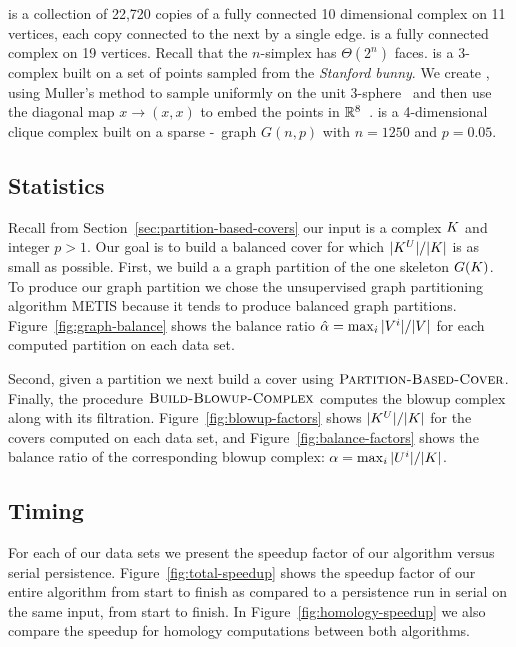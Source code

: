 {\blobs} is a collection of
22,720 copies of a fully connected 10 dimensional complex on 11 vertices, each 
copy connected to the next by a single edge. {\clique} is a fully 
connected complex on 19 vertices. Recall that the $n$-simplex has $\Theta(2^n)$ 
faces. {\bunny} is a 3-complex built on a set of points sampled from the 
\emph{Stanford bunny}. We create {\sphere}, using Muller's method to sample 
uniformly on the unit 3-sphere~\cite{m-nmgpuns-59} and then use the diagonal map
$x \rightarrow (x,x)$ to embed the points in $\mathbb{R}^8$~\cite{hatcher}. {\gnp} is a 
4-dimensional clique complex built on a sparse \Erdos-\Renyi\ graph $G(n,p)$ 
with $n = 1250$ and $p = 0.05$.
 
\subsection{Statistics}

Recall from Section~\ref{sec:partition-based-covers} our input is a complex
$K$ and integer $p > 1$. Our goal is to build a balanced cover for 
which $|K^{U}|/|K|$ is as small as possible. First, we build a a graph partition of
the one skeleton $G(K)$. To produce our graph partition we chose the
unsupervised graph partitioning algorithm METIS because it tends to produce 
balanced graph partitions. Figure~\ref{fig:graph-balance} shows the balance
ratio $\hat{\alpha} = \max_i{|V^i|}/|V|$ for each computed partition
on each data set.

Second, given a partition we next build a cover using 
$\textnormal{\scshape Partition-Based-Cover}$. Finally, the procedure 
$\textnormal{\scshape Build-Blowup-Complex}$ computes the blowup complex along with
its filtration. Figure~\ref{fig:blowup-factors} shows $|K^{U}|/|K|$ for 
the covers computed on each data set, and Figure~\ref{fig:balance-factors} 
shows the balance ratio of the corresponding blowup complex: 
$\alpha = \max_i{|U^i|}/|K|$.

 
\subsection{Timing}

For each of our data sets we present the speedup factor of
our algorithm versus serial persistence. Figure~\ref{fig:total-speedup}
shows the speedup factor of our entire algorithm from start to finish as 
compared to a persistence run in serial on the same input, from start to 
finish. In Figure~\ref{fig:homology-speedup} we also compare the speedup for 
homology computations between both algorithms.

